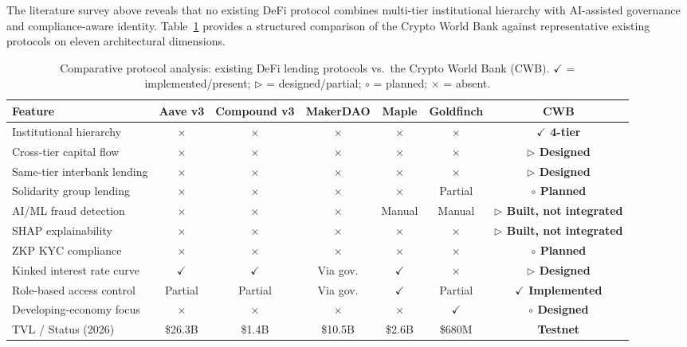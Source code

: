 \documentclass[12pt,a4paper]{report}  %
\newcommand{\tmarkDone}{\textcolor{green!55!black}{$\checkmark$}}
\newcommand{\tmarkNo}{\textcolor{red!75!black}{$\times$}}
\newcommand{\tmarkPartial}{\textcolor{orange!85!black}{$\triangleright$}}
\newcommand{\tmarkPlanned}{\textcolor{blue!75!black}{$\circ$}}
\newcommand{\tableheadcolor}{\rowcolor{PrimaryBlue!12}}
\newcommand{\tableheadfont}{\bfseries\small\color{PrimaryBlue}}
\begin{document}
The literature survey above reveals that no existing DeFi protocol combines multi-tier institutional hierarchy with AI-assisted governance and compliance-aware identity. Table~\ref{tab:protocol-comparison} provides a structured comparison of the Crypto World Bank against representative existing protocols on eleven architectural dimensions.

\begin{table}[H]
\centering
\setlength{\tabcolsep}{5pt}
\caption{Comparative protocol analysis: existing DeFi lending protocols vs.\ the Crypto World Bank (CWB). {\normalfont \tmarkDone{} = implemented/present; \tmarkPartial{} = designed/partial; \tmarkPlanned{} = planned; \tmarkNo{} = absent.}}
\label{tab:protocol-comparison}
\renewcommand{\arraystretch}{1.25}
\small
\begin{tabular}{@{}p{4.2cm}ccccc>{\bfseries}c@{}}
\toprule
\tableheadcolor
\tableheadfont Feature & \tableheadfont Aave v3 & \tableheadfont Compound v3 & \tableheadfont MakerDAO & \tableheadfont Maple & \tableheadfont Goldfinch & \tableheadfont CWB \\
\midrule
Institutional hierarchy & \tmarkNo{} & \tmarkNo{} & \tmarkNo{} & \tmarkNo{} & \tmarkNo{} & \tmarkDone{} 4-tier \\
\rowcolor{RowShade}
Cross-tier capital flow & \tmarkNo{} & \tmarkNo{} & \tmarkNo{} & \tmarkNo{} & \tmarkNo{} & \tmarkPartial{} Designed \\
Same-tier interbank lending & \tmarkNo{} & \tmarkNo{} & \tmarkNo{} & \tmarkNo{} & \tmarkNo{} & \tmarkPartial{} Designed \\
\rowcolor{RowShade}
Solidarity group lending & \tmarkNo{} & \tmarkNo{} & \tmarkNo{} & \tmarkNo{} & Partial & \tmarkPlanned{} Planned \\
AI/ML fraud detection & \tmarkNo{} & \tmarkNo{} & \tmarkNo{} & Manual & Manual & \tmarkPartial{} Built, not integrated \\
\rowcolor{RowShade}
SHAP explainability & \tmarkNo{} & \tmarkNo{} & \tmarkNo{} & \tmarkNo{} & \tmarkNo{} & \tmarkPartial{} Built, not integrated \\
ZKP KYC compliance & \tmarkNo{} & \tmarkNo{} & \tmarkNo{} & \tmarkNo{} & \tmarkNo{} & \tmarkPlanned{} Planned \\
\rowcolor{RowShade}
Kinked interest rate curve & \tmarkDone{} & \tmarkDone{} & Via gov. & \tmarkDone{} & \tmarkNo{} & \tmarkPartial{} Designed \\
Role-based access control & Partial & Partial & Via gov. & \tmarkDone{} & Partial & \tmarkDone{} Implemented \\
\rowcolor{RowShade}
Developing-economy focus & \tmarkNo{} & \tmarkNo{} & \tmarkNo{} & \tmarkNo{} & \tmarkDone{} & \tmarkPlanned{} Designed \\
TVL / Status (2026) & \$26.3B & \$1.4B & \$10.5B & \$2.6B & \$680M & Testnet \\
\bottomrule
\end{tabular}
\end{table}
\end{document}
